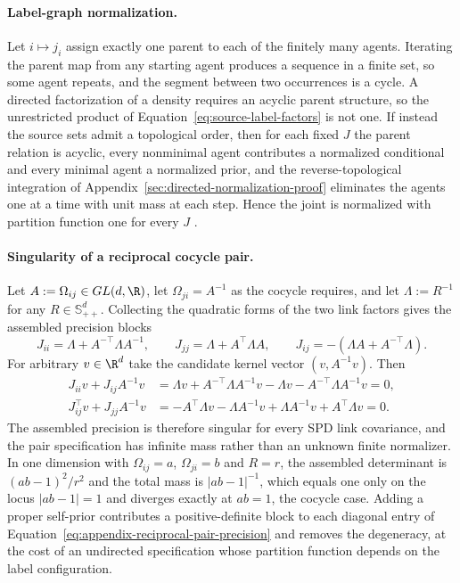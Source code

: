 \paragraph{Label-graph normalization.}
Let \(i\mapsto j_i\) assign exactly one parent to each of the finitely many agents. Iterating the parent map from any starting agent produces a sequence in a finite set, so some agent repeats, and the segment between two occurrences is a cycle. A directed factorization of a density requires an acyclic parent structure, so the unrestricted product of Equation~\eqref{eq:source-label-factors} is not one. If instead the source sets admit a topological order, then for each fixed \(J\) the parent relation is acyclic, every nonminimal agent contributes a normalized conditional and every minimal agent a normalized prior, and the reverse-topological integration of Appendix~\ref{sec:directed-normalization-proof} eliminates the agents one at a time with unit mass at each step. Hence the joint is normalized with partition function one for every \(J\) \citep{Lauritzen1996}.

\paragraph{Singularity of a reciprocal cocycle pair.}
Let \(A:=\Omega_{ij}\in GL(d,\R)\), let \(\Omega_{ji}=A^{-1}\) as the cocycle requires, and let \(\Lambda:=R^{-1}\) for any \(R\in\mathbb S_{++}^{d}\). Collecting the quadratic forms of the two link factors gives the assembled precision blocks
\begin{equation}
J_{ii}=\Lambda+A^{-\top}\Lambda A^{-1},
\qquad
J_{jj}=\Lambda+A^{\top}\Lambda A,
\qquad
J_{ij}=-\left(\Lambda A+A^{-\top}\Lambda\right).
\label{eq:appendix-reciprocal-pair-precision}
\end{equation}
For arbitrary \(v\in\R^{d}\) take the candidate kernel vector \((v,A^{-1}v)\). Then
\begin{align}
J_{ii}v+J_{ij}A^{-1}v
&=\Lambda v+A^{-\top}\Lambda A^{-1}v-\Lambda v-A^{-\top}\Lambda A^{-1}v=0,
\label{eq:appendix-reciprocal-kernel-first}\\
J_{ij}^{\top}v+J_{jj}A^{-1}v
&=-A^{\top}\Lambda v-\Lambda A^{-1}v+\Lambda A^{-1}v+A^{\top}\Lambda v=0.
\label{eq:appendix-reciprocal-kernel-second}
\end{align}
The assembled precision is therefore singular for every SPD link covariance, and the pair specification has infinite mass rather than an unknown finite normalizer. In one dimension with \(\Omega_{ij}=a\), \(\Omega_{ji}=b\) and \(R=r\), the assembled determinant is \((ab-1)^2/r^2\) and the total mass is \(\lvert ab-1\rvert^{-1}\), which equals one only on the locus \(\lvert ab-1\rvert=1\) and diverges exactly at \(ab=1\), the cocycle case. Adding a proper self-prior contributes a positive-definite block to each diagonal entry of Equation~\eqref{eq:appendix-reciprocal-pair-precision} and removes the degeneracy, at the cost of an undirected specification whose partition function depends on the label configuration.

